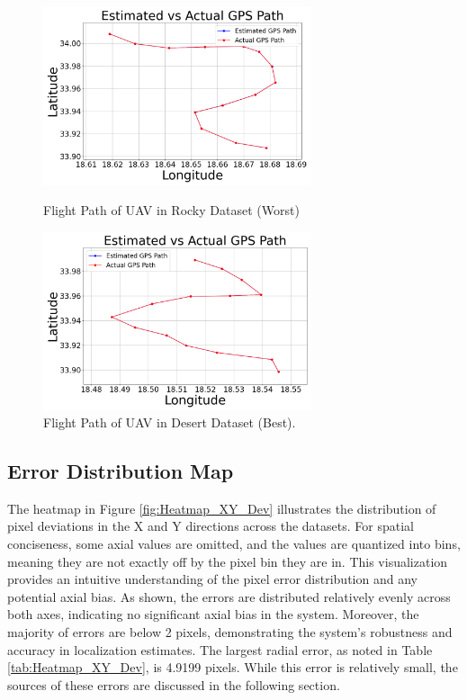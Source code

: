     \begin{figure}[H]
        \centering
        \begin{minipage}{0.45\textwidth}
            \centering
            \includegraphics[width=0.7\textwidth]{./Chapter 5/GPSpaths/PathCity1.png}
            \caption{Flight Path of UAV in Rocky Dataset (Worst)}
            \label{fig:Flight Path ROCKY}
        \end{minipage}\hfill
        \begin{minipage}{0.45\textwidth}
            \centering
            \includegraphics[width=0.7\textwidth]{./Chapter 5/GPSpaths/PathCity2.png}
            \caption{Flight Path of UAV in Desert Dataset (Best).}
            \label{fig:Flight Path DESERT}
        \end{minipage}
    \end{figure}





\subsection{Error Distribution Map}

The heatmap in Figure \ref{fig:Heatmap_XY_Dev} illustrates the distribution of pixel deviations in the X and Y directions across the datasets. For spatial conciseness, some axial values are omitted, and the values are quantized into bins, meaning they are not exactly off by the pixel bin they are in. This visualization provides an intuitive understanding of the pixel error distribution and any potential axial bias. As shown, the errors are distributed relatively evenly across both axes, indicating no significant axial bias in the system. Moreover, the majority of errors are below 2 pixels, demonstrating the system's robustness and accuracy in localization estimates. The largest radial error, as noted in Table \ref{tab:Heatmap_XY_Dev}, is 4.9199 pixels. While this error is relatively small, the sources of these errors are discussed in the following section.


